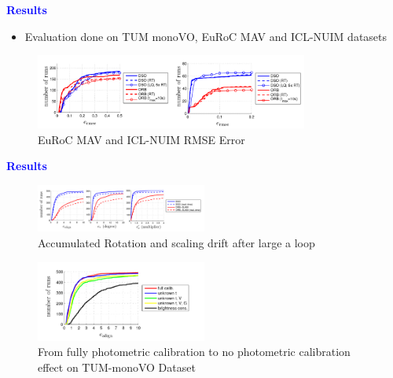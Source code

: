 \documentclass[aspectratio=169]{beamer}
\begin{document}

\begin{frame}{\textcolor{blue}{\textbf{Results}}}
	\vspace{-0.8cm}

	\begin{itemize}
		\item Evaluation done on TUM monoVO, EuRoC MAV and ICL-NUIM datasets
	\end{itemize}

	\begin{figure}
		\centering
		\includegraphics[width=0.8\textwidth]{pics/eruoc_mav_and_icl.png}
		\caption{EuRoC MAV and ICL-NUIM RMSE Error}
	\end{figure}
\end{frame}


\begin{frame}{\textcolor{blue}{\textbf{Results}}}
	\vspace{-1cm}

	\begin{figure}
		\centering
		\includegraphics[width=0.5\textwidth]{pics/tum_mono.png}
		\caption{Accumulated Rotation and scaling drift after large a loop}
	\end{figure}

	\vspace{-1cm}

	\begin{figure}
		\centering
		\includegraphics[width=0.5\textwidth]{pics/photometric_params.png}
		\caption{From fully photometric calibration to no photometric calibration effect on TUM-monoVO Dataset}
	\end{figure}

\end{frame}
\end{document}
